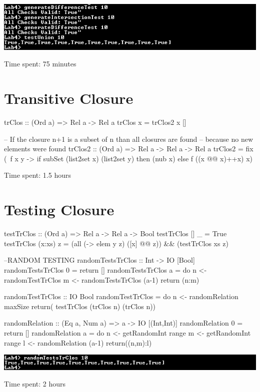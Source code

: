 \documentclass{article}
\begin{document}
\includegraphics{knipsel}

\newpage
Time spent: 75 minutes

\section*{Transitive Closure}
\begin{code}
trClos :: (Ord a) => Rel a -> Rel a
trClos x = trClos2 x []

-- If the closure n+1 is a subset of n than all closures are found
-- because no new elements were found
trClos2 :: (Ord a) => Rel a -> Rel a -> Rel a
trClos2  = fix (\ f x y ->
           if subSet (list2set x) (list2set y) then (nub x)
           else f ((x @@ x)++x) x) 
\end{code}

Time spent: 1.5 hours

\section*{Testing Closure}
\begin{code}
testTrClos :: (Ord a) => Rel a -> Rel a -> Bool
testTrClos [] _ = True
testTrClos (x:xs) z = (all (\y -> elem y z) ([x] @@ z)) && (testTrClos xs z)

--RANDOM TESTING
randomTestsTrClos :: Int -> IO [Bool]
randomTestsTrClos 0 = return []
randomTestsTrClos a = do 	n <- randomTestTrClos
				m <- randomTestsTrClos (a-1)
				return (n:m)

randomTestTrClos :: IO Bool
randomTestTrClos = do 	n <- randomRelation maxSize
			return( testTrClos (trClos n) (trClos n)) 

randomRelation :: (Eq a, Num a) => a -> IO [(Int,Int)]
randomRelation 0 = return []
randomRelation a = do 	n <- getRandomInt range
			m <- getRandomInt range
			l <- randomRelation (a-1)
			return((n,m):l) 

\end{code}

\includegraphics{knipsel2}

Time spent: 2 hours
\end{document}
